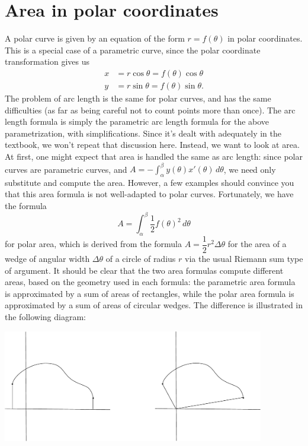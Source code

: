 \documentclass[letterpaper,12pt]{article}
\newcommand{\di}{\displaystyle}
\begin{document}
\section{Area in polar coordinates}
A polar curve is given by an equation of the form $r=f(\theta)$ in polar coordinates. This is a special case of a parametric curve, since the polar coordinate transformation gives us
\begin{align*}
 x &= r\cos\theta = f(\theta)\cos\theta\\
 y &= r\sin\theta = f(\theta)\sin\theta.
\end{align*}
The problem of arc length is the same for polar curves, and has the same difficulties (as far as being careful not to count points more than once). The arc length formula is simply the parametric arc length formula for the above parametrization, with simplifications. Since it's dealt with adequately in the textbook, we won't repeat that discussion here. Instead, we want to look at area. At first, one might expect that area is handled the same as arc length: since polar curves are parametric curves, and $\di A = -\int_\alpha^\beta y(\theta)x'(\theta)\,d\theta$, we need only substitute and compute the area. However, a few examples should convince you that this area formula is not well-adapted to polar curves. Fortunately, we have the formula
\[
 A = \int_\alpha^\beta\frac{1}{2}f(\theta)^2\,d\theta
\]
for polar area, which is derived from the formula $A = \dfrac{1}{2}r^2\Delta\theta$ for the area of a wedge of angular width $\Delta\theta$ of a circle of radius $r$ via the usual Riemann sum type of argument. It should be clear that the two area formulas compute different areas, based on the geometry used in each formula: the parametric area formula is approximated by a sum of areas of rectangles, while the polar area formula is approximated by a sum of areas of circular wedges. The difference is illustrated in the following diagram:
\begin{center}
 \includegraphics[width=4.5in]{polar_param.pdf}
\end{center}
\end{document}
